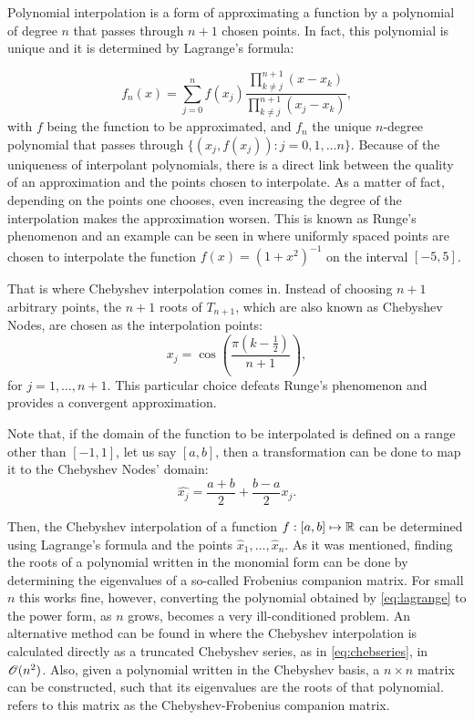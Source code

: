 Polynomial interpolation is a form of approximating a function by a polynomial of degree $n$ that passes through $n+1$ chosen points. In fact, this polynomial is unique and it is determined by Lagrange's formula:

\begin{equation}\label{eq:lagrange}
f_n(x) = \sum_{j=0}^{n} f(x_j)\dfrac{\prod_{k \neq j}^{n+1} (x-x_k)}{\prod_{k \neq j}^{n+1} (x_j-x_k)},
\end{equation} 
with $f$ being the function to be approximated, and $f_n$ the unique $n$-degree polynomial that passes through $\{(x_j, f(x_j)): j=0, 1, \dots n\}$. Because of the uniqueness of interpolant polynomials, there is a direct link between the quality of an approximation and the points chosen to interpolate. As a matter of fact, depending on the points one chooses, even increasing the degree of the interpolation makes the approximation worsen. This is known as Runge's phenomenon and an example can be seen in  where uniformly spaced points are chosen to interpolate the function $f(x) = (1+x^2)^{-1}$ on the interval $[-5, 5]$. 

That is where Chebyshev interpolation comes in. Instead of choosing $n+1$ arbitrary points, the $n+1$ roots of $T_{n+1}$, which are also known as Chebyshev Nodes, are chosen as the interpolation points:
\begin{equation}
x_j = \cos{\left(\dfrac{\pi(k-\frac{1}{2})}{n+1}\right)},
\end{equation}
for $j=1, \dots, n+1$. This particular choice defeats Runge's phenomenon and provides a convergent approximation. 

Note that, if the domain of the function to be interpolated is defined on a range other than $[-1, 1]$, let us say $[a, b]$, then a transformation can be done to map it to the Chebyshev Nodes' domain:
\begin{equation}
\hat{x_j} = \frac{a+b}{2} + \frac{b-a}{2}x_j.
\end{equation}

Then, the Chebyshev interpolation of a function $f: [a, b] \mapsto \mathbb{R}$ can be determined using Lagrange's formula and the points $\hat{x}_1, \dots, \hat{x}_n$. 
As it was mentioned, finding the roots of a polynomial written in the monomial form can be done by determining the eigenvalues of a so-called Frobenius companion matrix. For small $n$ this works fine, however, converting the polynomial obtained by \autoref{eq:lagrange} to the power form, as $n$ grows, becomes a very ill-conditioned problem. 
An alternative method can be found in  where the Chebyshev interpolation is calculated directly as a truncated Chebyshev series, as in \autoref{eq:chebseries}, in $\mathscr{O}(n^2)$. Also, given a polynomial written in the Chebyshev basis, a $n\times n$ matrix can be constructed, such that its eigenvalues are the roots of that polynomial.  refers to this matrix as the Chebyshev-Frobenius companion matrix.

